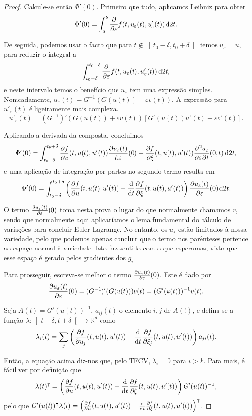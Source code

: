\documentclass{article}
\theoremstyle{nonumberplain}
\newtheorem{proof}{Proof}
\newcommand{\R}{\mathbb{R}}
\newcommand{\tr}{\intercal}
\begin{document}
\begin{proof}
Calcule-se então $\Phi'(0)$. Primeiro que tudo, aplicamos Leibniz para obter
\[\Phi'(0) = \int_a^b \diffp*{f(t, u_\varepsilon(t), u'_\varepsilon(t))}\varepsilon \dl2 t.\]

De seguida, podemos usar o facto que para $t \not \in \left]t_0-\delta,t_0+\delta\right[$ temos $u_\varepsilon = u$, para reduzir o integral a
\[\int_{t_0 - \delta}^{t_0 + \delta} \diffp*{f(t, u_\varepsilon(t), u'_\varepsilon(t))}\varepsilon \dl2 t,\]
e neste intervalo temos o benefício que $u_\varepsilon$ tem uma expressão simples. Nomeadamente, $u_\varepsilon(t) = G^{-1}(G(u(t)) + \varepsilon v(t))$. A expressão para $u'_\varepsilon(t)$ é ligeiramente mais complexa.
\[u'_\varepsilon(t) = (G^{-1})'(G(u(t)) + \varepsilon v(t)) [G'(u(t)) u'(t) + \varepsilon v'(t)].\]

Aplicando a derivada da composta, concluimos
\[\Phi'(0) = \int_{t_0 - \delta}^{t_0 + \delta} \diffp fu (t, u(t), u'(t)) \diffp {u_\varepsilon(t)} \varepsilon(0) + \diffp f \xi (t, u(t), u'(t)) \diffp{u_\varepsilon}{\varepsilon, t}(0,t)\dl2 t,\]
e uma aplicação de integração por partes no segundo termo resulta em
\[\Phi'(0) = \int_{t_0 - \delta}^{t_0 + \delta} \left( \diffp fu (t, u(t), u'(t))  - \diff*{\diffp f \xi (t, u(t), u'(t))}t \right) \diffp {u_\varepsilon(t)} \varepsilon(0)\dl2 t.\]

O termo $\diffp {u_\varepsilon(t)} \varepsilon(0)$ toma nesta prova o lugar do que normalmente chamamos $v$, sendo que normalmente aqui aplicaríamos o lema fundamental do cálculo de variações para concluir Euler-Lagrange. No entanto, os $u_\varepsilon$ estão limitados à nossa variedade, pelo que podemos apenas concluir que o termo nos parênteses pertence ao espaço normal à variedade. Isto faz sentido com o que esperamos, visto que esse espaço é gerado pelos gradientes dos $g_i$.

Para prosseguir, escreva-se melhor o termo $\diffp {u_\varepsilon(t)} \varepsilon(0)$. Este é dado por
\[\diffp {u_\varepsilon(t)} \varepsilon(0) = (G^{-1})'(G(u(t))) v(t) = (G'(u(t)))^{-1} v(t).\]

Seja $A(t) = G'(u(t))^{-1}$, $a_{ij}(t)$ o elemento $i,j$ de $A(t)$, e defina-se a função $\lambda \colon \left]t-\delta,t+\delta\right[ \to \R^d$ como
\[\lambda_i(t) = \sum_j \left( \diffp f{u_j} (t, u(t), u'(t))  - \diff*{\diffp f {\xi_j} (t, u(t), u'(t))}t \right) a_{ji}(t). \]

Então, a equação acima diz-nos que, pelo TFCV, $\lambda_i = 0$ para $i > k$. Para mais, é fácil ver por definição que
\[\lambda(t)^\tr = \left( \diffp fu (t, u(t), u'(t))  - \diff*{\diffp f \xi (t, u(t), u'(t))}t \right) G'(u(t))^{-1},\]
pelo que $G'(u(t))^\tr \lambda(t) = \left( \diffp fu (t, u(t), u'(t))  - \diff*{\diffp f \xi (t, u(t), u'(t))}t \right)^\tr$.


\end{proof}
\end{document}
